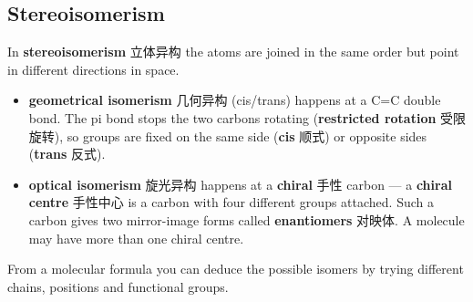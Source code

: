 \documentclass[11pt]{article}
\begin{document}
\subsection*{Stereoisomerism}

In \textbf{stereoisomerism} 立体异构 the atoms are joined in the same order but point in different directions in space.

\begin{itemize}
\item \textbf{geometrical isomerism} 几何异构 (cis/trans) happens at a C=C double bond. The pi bond stops the two carbons rotating (\textbf{restricted rotation} 受限旋转), so groups are fixed on the same side (\textbf{cis} 顺式) or opposite sides (\textbf{trans} 反式).

\item \textbf{optical isomerism} 旋光异构 happens at a \textbf{chiral} 手性 carbon — a \textbf{chiral centre} 手性中心 is a carbon with four different groups attached. Such a carbon gives two mirror-image forms called \textbf{enantiomers} 对映体. A molecule may have more than one chiral centre.

\end{itemize}

From a molecular formula you can deduce the possible isomers by trying different chains, positions and functional groups.
\end{document}
